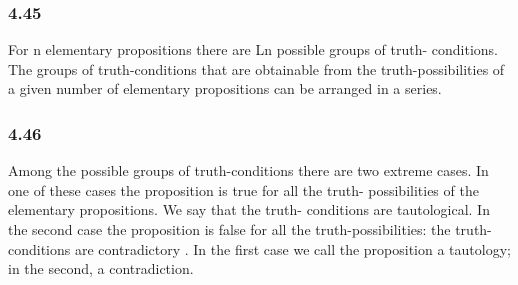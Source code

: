 \documentclass[11pt]{article}
\begin{document}
\subsubsection*{4.45}
\label{sec:org0d7327a}
For n elementary propositions there are Ln possible groups of truth-
conditions. The groups of truth-conditions that are obtainable from the
truth-possibilities of a given number of elementary propositions can be
arranged in a series.
\subsubsection*{4.46}
\label{sec:orgb56f876}
Among the possible groups of truth-conditions there are two extreme
cases. In one of these cases the proposition is true for all the truth-
possibilities of the elementary propositions. We say that the truth-
conditions are tautological. In the second case the proposition is false
for all the truth-possibilities: the truth-conditions are contradictory .
In the first case we call the proposition a tautology; in the second, a
contradiction.
\end{document}
